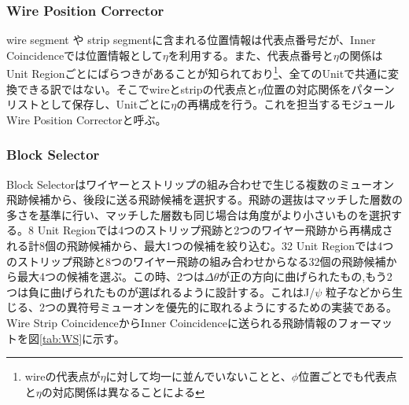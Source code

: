 \subsubsection*{Wire Position Corrector}
wire segment や strip segmentに含まれる位置情報は代表点番号だが、Inner Coincidenceでは位置情報として$\eta$を利用する。また、代表点番号と$\eta$の関係はUnit Regionごとにばらつきがあることが知られており\footnote{wireの代表点が$\eta$に対して均一に並んでいないことと、$\phi$位置ごとでも代表点と$\eta$の対応関係は異なることによる}、全てのUnitで共通に変換できる訳ではない。そこでwireとstripの代表点と$\eta$位置の対応関係をパターンリストとして保存し、Unitごとに$\eta$の再構成を行う。これを担当するモジュールWire Position Correctorと呼ぶ。

\subsubsection*{Block Selector}
Block Selectorはワイヤーとストリップの組み合わせで生じる複数のミューオン飛跡候補から、後段に送る飛跡候補を選択する。飛跡の選抜はマッチした層数の多さを基準に行い、マッチした層数も同じ場合は角度がより小さいものを選択する。8 Unit Regionでは4つのストリップ飛跡と2つのワイヤー飛跡から再構成される計8個の飛跡候補から、最大1つの候補を絞り込む。32 Unit Regionでは4つのストリップ飛跡と8つのワイヤー飛跡の組み合わせからなる32個の飛跡候補から最大4つの候補を選ぶ。この時、2つは$\Delta\theta$が正の方向に曲げられたもの,もう2つは負に曲げられたものが選ばれるように設計する。これはJ/$\psi$ 粒子などから生じる、2つの異符号ミューオンを優先的に取れるようにするための実装である。
Wire Strip CoincidenceからInner Coincidenceに送られる飛跡情報のフォーマットを図\ref{tab:WS}に示す。

